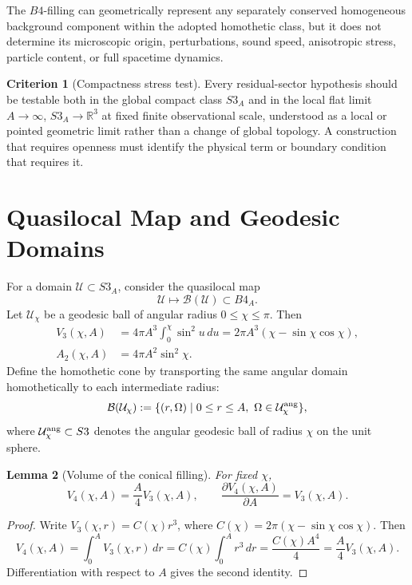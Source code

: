 \documentclass[11pt,a4paper]{article}
\def\Bfour{B4}%
\def\Sthree{S3}%
\def\dd{d}%
\numberwithin{equation}{section}
\theoremstyle{definition}
\newtheorem{criterion}{Criterion}
\theoremstyle{plain}
\newtheorem{lemma}[criterion]{Lemma}
\theoremstyle{remark}
\newcommand{\Sthree}{S^3}
\newcommand{\Bfour}{B^4}
\newcommand{\Dom}{\mathcal{U}}
\newcommand{\B}{\mathcal{B}}
\newcommand{\dd}{\mathrm{d}}
\begin{document}
The \(\Bfour\)-filling can geometrically represent any separately conserved homogeneous background component within the adopted homothetic class, but it does not determine its microscopic origin, perturbations, sound speed, anisotropic stress, particle content, or full spacetime dynamics.

\begin{criterion}[Compactness stress test]
Every residual-sector hypothesis should be testable both in the global compact class \(\Sthree_A\) and in the local flat limit \(A\to\infty\), \(\Sthree_A\to\mathbb{R}^3\) at fixed finite observational scale, understood as a local or pointed geometric limit rather than a change of global topology. A construction that requires openness must identify the physical term or boundary condition that requires it.
\end{criterion}

\section{Quasilocal Map and Geodesic Domains}
For a domain \(\Dom\subset \Sthree_A\), consider the quasilocal map
\begin{equation}
\Dom\longmapsto \B(\Dom)\subset \Bfour_A.
\end{equation}
Let \(\Dom_\chi\) be a geodesic ball of angular radius \(0\le \chi\le\pi\). Then
\begin{align}
V_3(\chi,A)&=4\pi A^3\int_0^\chi \sin^2u\,\dd u
=2\pi A^3(\chi-\sin\chi\cos\chi),\\
A_2(\chi,A)&=4\pi A^2\sin^2\chi.
\end{align}
Define the homothetic cone by transporting the same angular domain homothetically to each intermediate radius:
\begin{equation}
\B(\Dom_\chi):=\{(r,\Omega)\mid 0\le r\le A,\ \Omega\in \Dom_\chi^{\rm ang}\},
\end{equation}
where \(\Dom_\chi^{\rm ang}\subset \Sthree\) denotes the angular geodesic ball of radius \(\chi\) on the unit sphere.

\begin{lemma}[Volume of the conical filling]
For fixed \(\chi\),
\begin{equation}
V_4(\chi,A)=\frac{A}{4}V_3(\chi,A),
\qquad
\frac{\partial V_4(\chi,A)}{\partial A}=V_3(\chi,A).
\end{equation}
\end{lemma}
\begin{proof}
Write \(V_3(\chi,r)=C(\chi)r^3\), where \(C(\chi)=2\pi(\chi-\sin\chi\cos\chi)\). Then
\begin{equation}
V_4(\chi,A)=\int_0^A V_3(\chi,r)\,\dd r
=C(\chi)\int_0^A r^3\,\dd r
=\frac{C(\chi)A^4}{4}
=\frac{A}{4}V_3(\chi,A).
\end{equation}
Differentiation with respect to \(A\) gives the second identity.
\end{proof}
\end{document}
